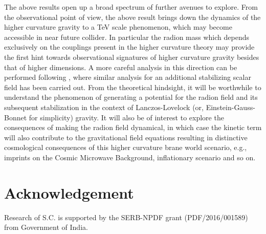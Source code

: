 \documentclass{article}
\begin{document}
The above results open up a broad spectrum of further avenues to explore. From the observational point of view, the above result brings down the dynamics of the higher curvature gravity to a TeV scale phenomenon, which may become accessible in near future collider. In particular the radion mass which depends exclusively on the couplings present in the higher curvature theory may provide the first hint towards observational signatures of higher curvature gravity besides that of higher dimensions. A more careful analysis in this direction can be performed following \cite{Hewett:1998sn,Das:2011fb,Davoudiasl:1999tf,Davoudiasl:2000wi,Chakraborty:2014xda}, where similar analysis for an additional stabilizing scalar field has been carried out. From the theoretical hindsight, it will be worthwhile to understand the phenomenon of generating a potential for the radion field and its subsequent stabilization in the context of Lanczos-Lovelock (or, Einstein-Gauss-Bonnet for simplicity) gravity. It will also be of interest 
to explore the consequences of making the radion field dynamical, in which case the kinetic term will also contribute to the gravitational field equations resulting in distinctive cosmological consequences of this higher curvature brane world scenario, e.g., imprints on the Cosmic Microwave Background, inflationary scenario and so on. 
\section*{Acknowledgement}

Research of S.C. is supported by the SERB-NPDF grant (PDF/2016/001589) from Government of India.

\appendix
{} 
\end{document}
